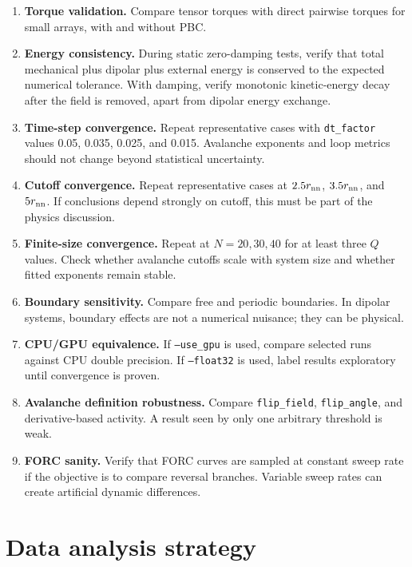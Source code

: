 \documentclass[11pt,a4paper]{article}
\newcommand{\code}[1]{\texttt{#1}}
\begin{document}
\begin{enumerate}[leftmargin=*]
\item \textbf{Torque validation.} Compare tensor torques with direct pairwise torques for small arrays, with and without PBC.
\item \textbf{Energy consistency.} During static zero-damping tests, verify that total mechanical plus dipolar plus external energy is conserved to the expected numerical tolerance. With damping, verify monotonic kinetic-energy decay after the field is removed, apart from dipolar energy exchange.
\item \textbf{Time-step convergence.} Repeat representative cases with \code{dt\_factor} values 0.05, 0.035, 0.025, and 0.015. Avalanche exponents and loop metrics should not change beyond statistical uncertainty.
\item \textbf{Cutoff convergence.} Repeat representative cases at $2.5r_{\rm nn}$, $3.5r_{\rm nn}$, and $5r_{\rm nn}$. If conclusions depend strongly on cutoff, this must be part of the physics discussion.
\item \textbf{Finite-size convergence.} Repeat at $N=20,30,40$ for at least three $Q$ values. Check whether avalanche cutoffs scale with system size and whether fitted exponents remain stable.
\item \textbf{Boundary sensitivity.} Compare free and periodic boundaries. In dipolar systems, boundary effects are not a numerical nuisance; they can be physical.
\item \textbf{CPU/GPU equivalence.} If \code{--use\_gpu} is used, compare selected runs against CPU double precision. If \code{--float32} is used, label results exploratory until convergence is proven.
\item \textbf{Avalanche definition robustness.} Compare \code{flip\_field}, \code{flip\_angle}, and derivative-based activity. A result seen by only one arbitrary threshold is weak.
\item \textbf{FORC sanity.} Verify that FORC curves are sampled at constant sweep rate if the objective is to compare reversal branches. Variable sweep rates can create artificial dynamic differences.
\end{enumerate}

\section{Data analysis strategy}
\label{sec:analysis}
\end{document}
